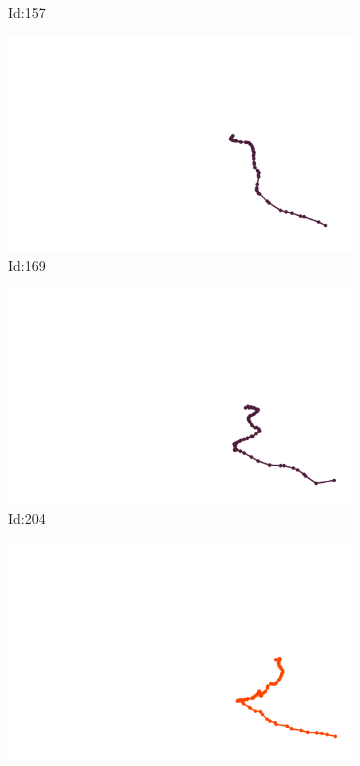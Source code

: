 \documentclass[12pt,twoside]{report}
\begin{document}
\begin{figure}
\begin{subfigure}[b]{0.20\textwidth}
\caption{Id:157}
\end{subfigure}
\begin{subfigure}[b]{0.20\textwidth}
\centering
\includegraphics[width=\textwidth]{../trajectories/169.png}
\caption{Id:169}
\end{subfigure}
\begin{subfigure}[b]{0.20\textwidth}
\centering
\includegraphics[width=\textwidth]{../trajectories/204.png}
\caption{Id:204}
\end{subfigure}
\begin{subfigure}[b]{0.20\textwidth}
\centering
\includegraphics[width=\textwidth]{../trajectories/216.png}

\end{subfigure}
\end{figure}
\end{document}
